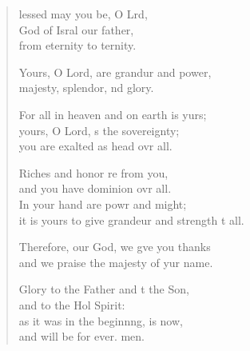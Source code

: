 \begin{verse}
  \begin{patverse}
    lessed may you be, O Lrd,\Flex\\
God of Isral our father,\Med\\
from eternity to ternity.

Yours, O Lord, are grandur and power,\Med\\
majesty, splendor, nd glory.

For all in heaven and on earth is yurs;\Flex\\
yours, O Lord, \pointup{\i}s the sovereignty;\Med\\
you are exalted as head ovr all.

Riches and honor re from you,\Med\\
and you have dominion ovr all.\\
In your hand are powr and might;\Med\\
it is yours to give grandeur and strength t all.

Therefore, our God, we g\pointup{\i}ve you thanks\Med\\
and we praise the majesty of yur name.

Glory to the Father and t the Son,\Med\\
    and to the Hol Spirit:\\
as it was in the beginn\pointup{\i}ng, is now,\Med\\
    and will be for ever. men.
  \end{patverse}
\end{verse}
